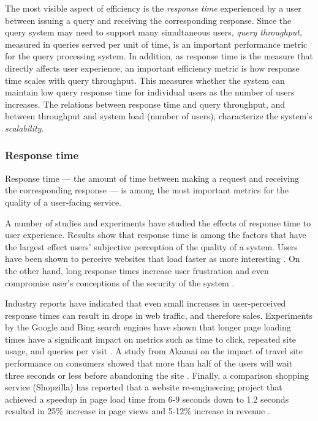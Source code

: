 The most visible aspect of efficiency is the \textit{response time} experienced by a user between issuing a query and
receiving the corresponding response.
Since the query system may need to support many simultaneous users, \textit{query throughput}, measured in queries served
per unit of time, is an important performance metric for the query processing system.
In addition, as response time is the measure that directly affects user experience, an important efficiency metric is
how response time scales with query throughput.
This measures whether the system can maintain low query response time for individual users as the number of users
increases.
The relations between response time and query throughput, and between throughput and system load (number of users),
characterize the system's \textit{scalability}.

\subsubsection{Response time}
Response time --- the amount of time between making a request and receiving the corresponding response ---
is among the most important metrics for the quality of a user-facing service.

A number of studies and experiments have studied the effects of response time to user experience.
Results show that response time is among the factors that have the largest effect users' subjective perception of the
quality of a system.
Users have been shown to perceive websites that load faster as more interesting \cite{ramsay/retrievaltimesinvestigation}.
On the other hand, long response times increase user frustration \cite{ceaparu:userfrustration} and even compromise
user's conceptions of the security of the system \cite{bouch:qualityeyebeholder}.

Industry reports have indicated that even small increases in user-perceived response times can result in drops in web
traffic, and therefore sales.
Experiments by the Google and Bing search engines have shown that longer page loading times have a significant impact on
metrics such as time to click, repeated site usage, and queries per visit \cite{schurman:rerformanceuserimpact}.
A study from Akamai on the impact of travel site performance on consumers showed that more than half of the users will
wait three seconds or less before abandoning the site \cite{akamai:travelsiteperformance}.
Finally, a comparison shopping service (Shopzilla) has reported that a website re-engineering project that achieved a
speedup in page load time from 6-9 seconds down to 1.2 seconds resulted in 25\% increase in page views and 5-12\%
increase in revenue \cite{dixon:shopzillasiteredo}.

